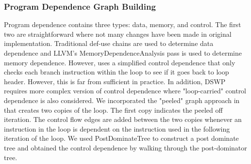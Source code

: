 \documentclass[letterpaper, 10 pt, conference]{ieeeconf}  %
\begin{document}
\subsubsection{Program Dependence Graph Building} 

Program dependence contains three types: data, memory, and control. The first two are straightforward where not many changes have been made in original implementation. Traditional def-use chains are used to determine data dependence and LLVM's MemoryDependenceAnalysis pass is used to determine memory dependence. However, \cite{c2} uses a simplified control dependence that only checks each branch instruction within the loop to see if it goes back to loop header. However, this is far from sufficient in practice. In addition, DSWP requires more complex version of control dependence where "loop-carried" control dependence is also considered. We incorporated the "peeled" graph approach in \cite{c3} that creates two copies of the loop. The first copy indicates the peeled off iteration. The control flow edges are added between the two copies whenever an instruction in the loop is dependent on the instruction used in the following iteration of the loop. We used PostDominateTree to construct a post dominate tree and obtained the control dependence by walking through the post-dominator tree. 
\end{document}
